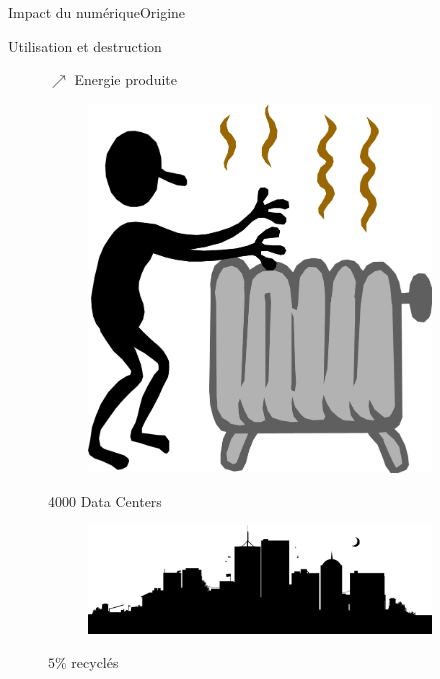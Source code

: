 \begin{frame}{Impact du numérique}{Origine}
\begin{block}{Utilisation et destruction }
\begin{figure}[h!]
\begin{minipage}[b]{0.27\linewidth}
 $\nearrow$ Energie produite
\begin{figure}
    \centering
    \includegraphics[scale=0.26]{Feathergraphics/rad.png}
\end{figure}
\end{minipage}\hfill
\begin{minipage}[b]{0.3\linewidth}  
4000 Data Centers

\begin{figure}
    \centering
    \includegraphics[scale=0.03]{Feathergraphics/ville.png}
\end{figure}
\end{minipage}\hfill
\begin{minipage}[b]{0.3\linewidth}  
$5\%$ recyclés


\end{minipage}
\end{figure}
\end{block}
\end{frame}
